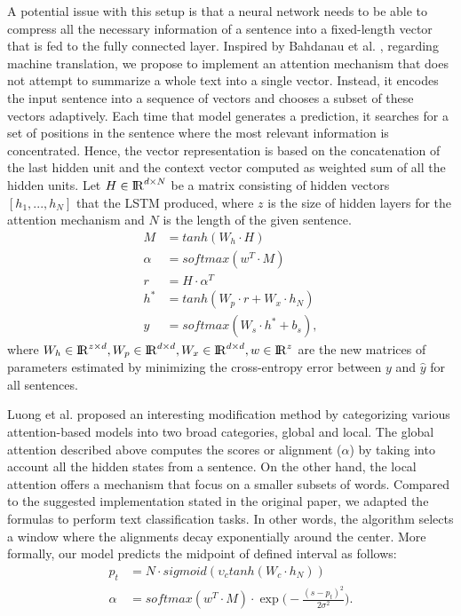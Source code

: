 A potential issue with this setup is that a neural network needs to be able to compress all the necessary information of a sentence into a fixed-length vector that is fed to the fully connected layer. Inspired by Bahdanau et al. \cite{AttentionBahdanau}, regarding machine translation, we propose to implement an attention mechanism that does not attempt to summarize a whole text into a single vector. Instead, it encodes the input sentence into a sequence of vectors and chooses a subset of these vectors adaptively. Each time that model generates a prediction, it searches for a set of positions in the sentence where the most relevant information is concentrated. Hence, the vector representation is based on the concatenation of the last hidden unit and the context vector computed as weighted sum of all the hidden units. Let $H \in {\rm I\!R}^{d\times N}$ be a matrix consisting of hidden vectors $[h_1, ... , h_N]$ that the LSTM produced, where $z$ is the size of hidden layers for the attention mechanism and $N$ is the length of the given sentence.	
\begin{align}
	M &= \mathit{tanh}(W_h \cdot H)\\
	\alpha &= \mathit{softmax}(w^{T} \cdot M)\\
	r &= H \cdot \alpha^T\\ h^* &= \mathit{tanh}(W_p \cdot  r + W_x \cdot h_N)\\
	y &= \mathit{softmax}(W_s \cdot  h^* + b_s),
\end{align}	
where $W_h \in {\rm I\!R}^{z\times d}, W_p \in {\rm I\!R}^{d\times d},  W_x \in {\rm I\!R}^{d\times d}, w \in {\rm I\!R}^{z}$ are the new matrices of parameters estimated by minimizing the cross-entropy error between $y$ and $\hat{y}$ for all sentences.
	
Luong et al. \cite{luong2015effective} proposed an interesting modification method by categorizing various attention-based models into two broad categories, global and local. The global attention described above computes the scores or alignment ($\alpha$) by taking into account all the hidden states from a sentence. On the other hand, the local attention offers a mechanism that focus on a smaller subsets of words. Compared to the suggested implementation stated in the original paper, we adapted the formulas to perform text classification tasks. In other words, the algorithm selects a window where the alignments decay exponentially around the center. More formally, our model predicts the midpoint of defined interval as follows:  
\begin{align}
	p_t &= N \cdot \mathit{sigmoid}(\upsilon_c \mathit{tanh}(W_c \cdot h_N))\\
	\alpha &= \mathit{softmax}(w^{T} \cdot M) \cdot \exp\bigg(-\frac{(s - p_t)^2}{2\sigma^2}\bigg).
\end{align}
		
